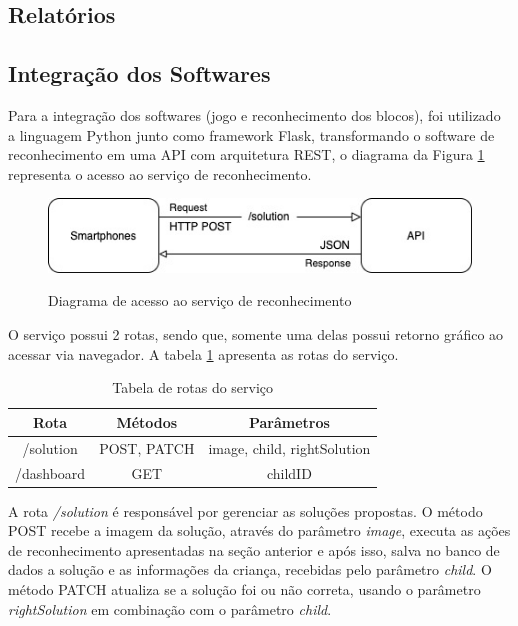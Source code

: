     \subsection{Relatórios}
    
    
    \subsection {Integração dos Softwares}
    
    Para a integração dos softwares (jogo e reconhecimento dos blocos), foi utilizado a linguagem Python junto como framework Flask, transformando o software de reconhecimento em uma API com arquitetura REST, o diagrama da Figura \ref{figura:diagrama_acesso_integracao} representa o acesso ao serviço de reconhecimento.
    
    \begin{figure}[H]
        \caption{Diagrama de acesso ao serviço de reconhecimento}
        \centering
        \includegraphics[width=15cm]{Imagens/Cap4/diagrama_acesso_integracao.jpg}
        \label{figura:diagrama_acesso_integracao}
    \end{figure}
    
    O serviço possui 2 rotas, sendo que, somente uma delas possui retorno gráfico ao acessar via navegador. A tabela \ref{tab:rotas} apresenta as rotas do serviço.
    
    \begin{table}[H]
        \centering
        \caption{Tabela de rotas do serviço}
        \label{tab:rotas}
        \begin{tabular}{|c|c|c|}
            \hline
            {Rota} & {Métodos} & {Parâmetros}  \\ \hline
            /solution & POST, PATCH & image, child, rightSolution \\ \hline
            /dashboard & GET & childID \\ \hline
        \end{tabular}
    \end{table}
    
    A rota \textit{/solution} é responsável por gerenciar as soluções propostas. O método POST recebe a imagem da solução, através do parâmetro \textit{image}, executa as ações de reconhecimento apresentadas na seção anterior e após isso, salva no banco de dados a solução e as informações da criança, recebidas pelo parâmetro \textit{child}. O método PATCH atualiza se a solução foi ou não correta, usando o parâmetro \textit{rightSolution} em combinação com o parâmetro \textit{child}.
    
